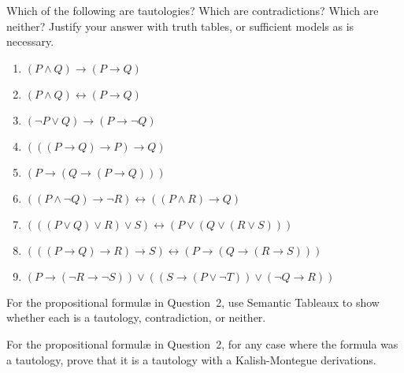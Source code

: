 \documentclass[12pt]{article}
\newenvironment{solution}[2][Solution]{ \begin{trivlist}
\item[\hskip \labelsep {\bfseries #1}]}{\end{trivlist}}
\newenvironment{problem}[2][Problem]{\begin{trivlist}
\item[\hskip \labelsep {\bfseries #1}\hskip \labelsep {\bfseries #2.}]}{\end{trivlist}}
\begin{document}
\begin{solution}{1}
\end{solution}

\vskip 0.5in

\begin{problem}{2}
Which of the following are tautologies?  Which are contradictions?  Which are neither?  Justify your answer with truth tables, or sufficient models as is necessary.
\begin{enumerate}
  \parskip=0in
  \parsep=0in
  \itemsep=0in
\item $(P \wedge Q) \rightarrow (P \rightarrow Q)$
\item $(P \wedge Q) \leftrightarrow (P \rightarrow Q)$
\item $(\lnot P \vee Q) \rightarrow (P \rightarrow \lnot Q)$
\item $(((P \rightarrow Q) \rightarrow P) \rightarrow Q)$
\item $(P \rightarrow (Q \rightarrow (P \rightarrow Q)))$
\item $((P \wedge \lnot Q) \rightarrow \lnot R) \leftrightarrow ((P \wedge R) \rightarrow Q)$
\item $(((P \vee Q) \vee R) \vee S) \leftrightarrow (P \vee (Q \vee (R \vee S)))$
\item $(((P \rightarrow Q) \rightarrow R) \rightarrow S) \leftrightarrow (P \rightarrow (Q \rightarrow (R \rightarrow S)))$
\item $(P \rightarrow (\lnot R \rightarrow \lnot S)) \vee ((S \rightarrow (P \vee \lnot T)) \vee (\lnot Q \rightarrow R))$
\end{enumerate}
\end{problem}
\begin{solution}{2}
\item[]
\end{solution}

\pagebreak


\begin{problem}{3}
For the propositional formul{\ae} in Question~2, use Semantic Tableaux to show whether each is a tautology, contradiction, or neither.
\end{problem}
\begin{solution}{3}
\item[]
\end{solution}

\vskip 0.5in

\begin{problem}{4} For the propositional formul{\ae} in Question~2, for any case where the formula was a tautology, prove that it is a tautology with a Kalish-Montegue derivations.
\end{problem}
\begin{solution}{4}
\item[]
\end{solution}
\end{document}
